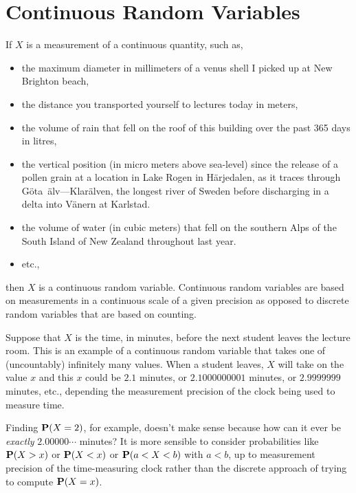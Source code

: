 

\section{Continuous Random Variables}\label{S:ContRVs}

If $X$ is a measurement of a continuous quantity, such as,
\begin{itemize}
\item the maximum diameter in millimeters of a venus shell I picked up at New Brighton beach, 
\item the distance you transported yourself to lectures today in meters, 
\item the volume of rain that fell on the roof of this building over the past 365 days in litres,
\item the vertical position (in micro meters above sea-level) since the release of a pollen grain at a location in Lake Rogen in H\"arjedalen, as it traces through G\"ota~\"alv—Klar\"alven, the longest river of Sweden before discharging in a delta into V\"anern at Karlstad. 
\item the volume of water (in cubic meters) that fell on the southern Alps of the South Island of New Zealand throughout last year.  
\item etc.,
\end{itemize}
then $X$ is a continuous random variable. Continuous random variables are based on measurements in a continuous scale of a given precision as opposed to discrete random variables that are based on counting.

\begin{example}\label{EgTimeStudentLeaves}
Suppose that  $X$ is  the time, in minutes, before the next student
  leaves the lecture room. This is an example of a  continuous random
  variable that takes one of (uncountably)  infinitely many values.
  When a student leaves, $X$ will take on the value $x$ and this $x$
  could be $2.1$ minutes, or $2.1000000001$ minutes,  or $2.9999999$
  minutes, etc., depending the measurement precision of the clock being used to measure time.  

Finding $\mathbf{P}(X=2)$, for example,  doesn't make sense because
  how can it ever be {\em exactly} $2.00000 \cdots$ minutes? It is more
  sensible to consider  probabilities like  $\mathbf{P}(X>x)$ or $\mathbf{P}(X<x)$ or $\mathbf{P}(a < X < b)$ with $a < b$, up to measurement precision of the time-measuring clock rather
  than the discrete approach of trying to compute $\mathbf{P}(X=x)$.
\end{example}

